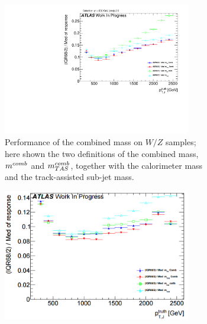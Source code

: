 

\begin{figure}
    \centering
    \begin{subfigure}[b]{0.45\textwidth}
  \centering
      \includegraphics[width=0.9\textwidth]{jet_part/mcomb/mcombtas3.pdf}
  \caption[$\mcombtas$ on the boosted $W/Z$]{Performance of the combined mass on $W/Z$ samples; here shown the two definitions of the combined mass, $m^{comb}$ and $\mcombtas$, together with the calorimeter mass and the track-assisted sub-jet mass.}
  \label{fig:mcombtas3}
    \end{subfigure}
    \begin{subfigure}[b]{0.45\textwidth}
  \centering
      \includegraphics[width=0.9\textwidth]{jet_part/mcomb/mcombtas4.png}

\end{subfigure}
\end{figure}
